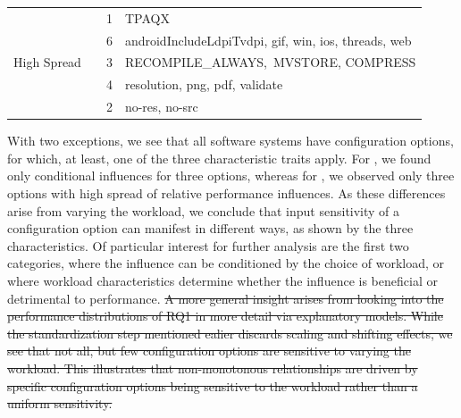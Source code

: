 {\begin{table}[ht!]
\begin{tabular}{lp{1.5cm}rp{4.3cm}}
		\multirow{5}{*}{\parbox{1.3cm}{High Spread}} & \kanzi & 1 & \textsf{TPAQX}\\
		\cmidrule{2-4}
		& \dconvert & 6 & \textsf{androidIncludeLdpiTvdpi, gif, win, ios, threads, web} \\
		\cmidrule{2-4}
		& \htwo & 3 & \textsf{\mbox{RECOMPILE\_ALWAYS, MVSTORE}, \mbox{COMPRESS}} \\
		\cmidrule{2-4}
		& \batik & 4 & \textsf{resolution, png, pdf, validate}\\
		\cmidrule{2-4}
		& \jadx & 2 & \textsf{no-res, no-src}\\
		\bottomrule
	\end{tabular}	
\label{tab:option_classification}
\end{table}

{\color{purple!50!violet}
	With two exceptions, we see that all software systems have configuration options, for which, at least, one of the three characteristic traits apply. For \jumper, we found only conditional influences for three options, whereas for \jadx, we observed only three options with high spread of relative performance influences. As these differences arise from varying the workload, we conclude that input sensitivity of a configuration option can manifest in different ways, as shown by the three characteristics. Of particular interest for further analysis are the first two categories, where the influence can be conditioned by the choice of workload, or where workload characteristics determine whether the influence is beneficial or detrimental to performance.
}
\st{A more general insight arises from looking into the performance distributions of RQ1 in more detail via explanatory models. While the standardization step mentioned ealier discards scaling and shifting effects, we see that not all, but few configuration options are sensitive to varying the workload. This illustrates that non-monotonous relationships are driven by specific configuration options being sensitive to the workload rather than a uniform sensitivity.}
\vspace{2mm}

}
